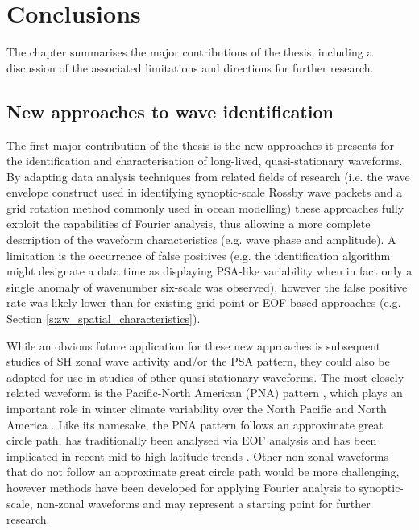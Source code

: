 
\chapter{Conclusions}\label{c:conclusions}


\begin{synopsis}

The chapter summarises the major contributions of the thesis, including a discussion of the associated limitations and directions for further research.

\end{synopsis}


\section{New approaches to wave identification}

The first major contribution of the thesis is the new approaches it presents for the identification and characterisation of long-lived, quasi-stationary waveforms. By adapting data analysis techniques from related fields of research (i.e. the wave envelope construct used in identifying synoptic-scale Rossby wave packets and a grid rotation method commonly used in ocean modelling) these approaches fully exploit the capabilities of Fourier analysis, thus allowing a more complete description of the waveform characteristics (e.g. wave phase and amplitude). A limitation is the occurrence of false positives (e.g. the identification algorithm might designate a data time as displaying PSA-like variability when in fact only a single anomaly of wavenumber six-scale was observed), however the false positive rate was likely lower than for existing grid point or EOF-based approaches (e.g. Section \ref{s:zw_spatial_characteristics}).

While an obvious future application for these new approaches is subsequent studies of SH zonal wave activity and/or the PSA pattern, they could also be adapted for use in studies of other quasi-stationary waveforms. The most closely related waveform is the Pacific-North American (PNA) pattern \citep{Wallace1981}, which plays an important role in winter climate variability over the North Pacific and North America \citep[e.g.][]{Notaro2006}. Like its namesake, the PNA pattern follows an approximate great circle path, has traditionally been analysed via EOF analysis and has been implicated in recent mid-to-high latitude trends \citep[e.g.][]{Ding2014,Liu2015}. Other non-zonal waveforms that do not follow an approximate great circle path would be more challenging, however methods have been developed for applying Fourier analysis to synoptic-scale, non-zonal waveforms \citep{Zimin2006,Souders2014} and may represent a starting point for further research. 

